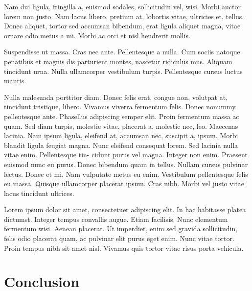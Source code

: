 \documentclass{article}
\begin{document}
	Nam dui ligula, fringilla a, euismod sodales, sollicitudin vel, wisi. Morbi auctor lorem non justo.
	Nam lacus libero, pretium at, lobortis vitae, ultricies et, tellus. Donec aliquet, tortor sed accumsan
	bibendum, erat ligula aliquet magna, vitae ornare odio metus a mi. Morbi ac orci et nisl hendrerit
	mollis. 

	Suspendisse ut massa. Cras nec ante. Pellentesque a nulla. Cum sociis natoque penatibus
	et magnis dis parturient montes, nascetur ridiculus mus. Aliquam tincidunt urna. Nulla ullamcorper
	vestibulum turpis. Pellentesque cursus luctus mauris.
	
	Nulla malesuada porttitor diam. Donec felis erat, congue non, volutpat at, tincidunt tristique, libero.
	Vivamus viverra fermentum felis. Donec nonummy pellentesque ante. Phasellus adipiscing semper 	elit. 
	Proin fermentum massa ac quam. Sed diam turpis, molestie vitae, placerat a, molestie nec, leo.
	Maecenas lacinia. Nam ipsum ligula, eleifend at, accumsan nec, suscipit a, ipsum. Morbi blandit
	ligula feugiat magna. Nunc eleifend consequat lorem. Sed lacinia nulla vitae enim. Pellentesque tin-
	cidunt purus vel magna. Integer non enim. Praesent euismod nunc eu purus. Donec bibendum quam
	in tellus. Nullam cursus pulvinar lectus. Donec et mi. Nam vulputate metus eu enim. Vestibulum
	pellentesque felis eu massa.
	Quisque ullamcorper placerat ipsum. Cras nibh. Morbi vel justo vitae lacus tincidunt ultrices. 
	
	Lorem
	ipsum dolor sit amet, consectetuer adipiscing elit. In hac habitasse platea dictumst. Integer tempus
	convallis augue. Etiam facilisis. Nunc elementum fermentum wisi. Aenean placerat. Ut imperdiet,
	enim sed gravida sollicitudin, felis odio placerat quam, ac pulvinar elit purus eget enim. Nunc vitae
	tortor. Proin tempus nibh sit amet nisl. Vivamus quis tortor vitae risus porta vehicula.


\section{Conclusion}
\label{sec:conclusion}
\end{document}
